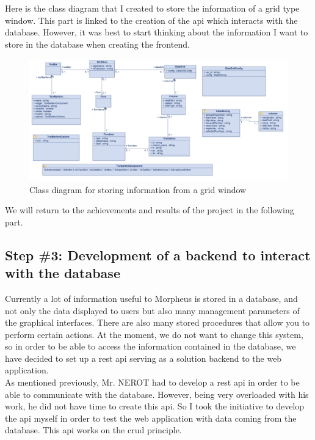 \documentclass[a4paper, 12pt, french]{article}
\begin{document}
					Here is the class diagram that I created to store the information of a grid type window. This part is linked to the creation of the \acrshort{api} which interacts with the database. However, it was best to start thinking about the information I want to store in the database when creating the \gls{frontend}.

					\begin{figure}[ht!]
						\begin{center}
							\includegraphics[width=\linewidth]{images/diagramme_classes.png}
						\end{center}
						\caption{Class diagram for storing information from a grid window}
						\label{fig:diagramme_classes}
					\end{figure}
					
					\noindent We will return to the achievements and results of the project in the following part.
					\newpage
				\subsection{Step \#3: Development of a \gls{backend} to interact with the database}
					Currently a lot of information useful to Morpheus is stored in a database, and not only the data displayed to users but also many management parameters of the graphical interfaces. There are also many stored procedures that allow you to perform certain actions. At the moment, we do not want to change this system, so in order to be able to access the information contained in the database, we have decided to set up a \acrshort{rest} \acrshort{api} serving as a solution \gls{backend} to the web application.\\

					As mentioned previously, Mr. NEROT had to develop a \acrshort{rest} \acrshort{api} in order to be able to communicate with the database. However, being very overloaded with his work, he did not have time to create this \acrshort{api}. So I took the initiative to develop the \acrshort{api} myself in order to test the web application with data coming from the database. This \acrshort{api} works on the \gls{crud} principle.
			
\end{document}
